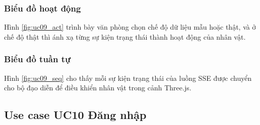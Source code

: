 \documentclass[../DoAn.tex]{subfiles}
\begin{document}

\subsubsection{Biểu đồ hoạt động}
Hình \ref{fig:uc09_act} trình bày văn phòng chọn chế độ dữ liệu mẫu hoặc thật, và ở chế độ thật thì ánh xạ từng sự kiện trạng thái thành hoạt động của nhân vật.


\subsubsection{Biểu đồ tuần tự}
Hình \ref{fig:uc09_seq} cho thấy mỗi sự kiện trạng thái của luồng SSE được chuyển cho bộ đạo diễn để điều khiển nhân vật trong cảnh Three.js.



\subsection{Use case UC10 Đăng nhập}
\label{subsection:uc10}
\end{document}
